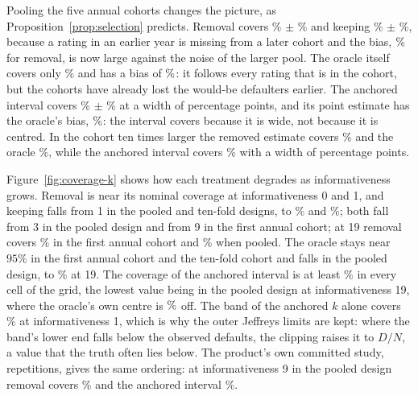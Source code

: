 Pooling the five annual cohorts changes the picture, as Proposition~\ref{prop:selection} predicts. Removal covers \% $\pm$ \% and keeping \% $\pm$ \%, because a rating \wdn{} in an earlier year is missing from a later cohort and the bias, $\nv{bias.pool.i9.industry}\%$ for removal, is now large against the noise of the larger pool. The oracle itself covers only \% and has a bias of $\nv{bias.pool.i9.followed}\%$: it follows every rating that is in the cohort, but the cohorts have already lost the would-be defaulters \wdn{} earlier. The anchored interval covers \% $\pm$ \% at a width of  percentage points, and its point estimate has the oracle's bias, $\nv{bias.pool.i9.anchored}\%$: the interval covers because it is wide, not because it is centred. In the cohort ten times larger the removed estimate covers \% and the oracle \%, while the anchored interval covers \% with a width of  percentage points.



Figure~\ref{fig:coverage-k} shows how each treatment degrades as informativeness grows. Removal is near its nominal coverage at informativeness 0 and 1, and keeping falls from 1 in the pooled and ten-fold designs, to \% and \%; both fall from 3 in the pooled design and from 9 in the first annual cohort; at 19 removal covers \% in the first annual cohort and \% when pooled. The oracle stays near $95\%$ in the first annual cohort and the ten-fold cohort and falls in the pooled design, to \% at 19. The coverage of the anchored interval is at least \% in every cell of the grid, the lowest value being in the pooled design at informativeness 19, where the oracle's own centre is $\nv{bias.pool.i19.followed}\%$ off. The band of the anchored $k$ alone covers \% at informativeness 1, which is why the outer Jeffreys limits are kept: where the band's lower end falls below the observed defaults, the clipping raises it to $D/N$, a value that the truth often lies below. The product's own committed study,  repetitions, gives the same ordering: at informativeness 9 in the pooled design removal covers \% and the anchored interval \%.

